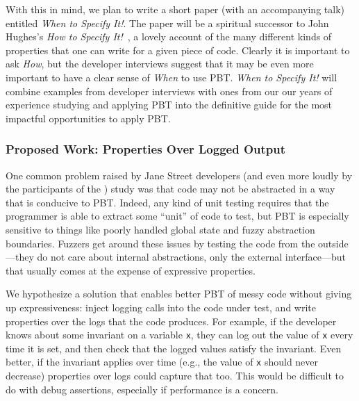 With this in mind, we plan to write a short paper (with an accompanying talk)
entitled {\em When to Specify It!}. The paper will be a spiritual successor to
John Hughes's {\em How to Specify It!}~\cite{HowToSpecifyIt}, a lovely account
of the many different kinds of properties that one can write for a given piece
of code. Clearly it is important to ask {\em How}, but the developer interviews
suggest that it may be even more important to have a clear sense of {\em When}
to use PBT. {\em When to Specify It!} will combine examples from developer
interviews with ones from our our years of experience studying and applying PBT
into the definitive guide for the most impactful opportunities to apply PBT.

\subsubsection{Proposed Work: Properties Over Logged Output}
One common problem raised by Jane Street developers (and even more loudly by the
participants of the ) study was that code may not be abstracted
in a way that is conducive to PBT. Indeed, any kind of unit testing requires
that the programmer is able to extract some ``unit'' of code to test, but PBT is
especially sensitive to things like poorly handled global state and fuzzy
abstraction boundaries. Fuzzers  get around these issues by
testing the code from the outside---they do not care about internal
abstractions, only the external interface---but that usually comes at the
expense of expressive properties.

We hypothesize a solution that enables better PBT of messy code without giving
up expressiveness: inject logging calls into the code under test, and write
properties over the logs that the code produces. For example, if the developer
knows about some invariant on a variable \lstinline{x}, they can log out the
value of \lstinline{x} every time it is set, and then check that the logged
values satisfy the invariant. Even better, if the invariant applies over time
(e.g., the value of \lstinline{x} should never decrease) properties over logs
could capture that too. This would be difficult to do with debug assertions,
especially if performance is a concern.

